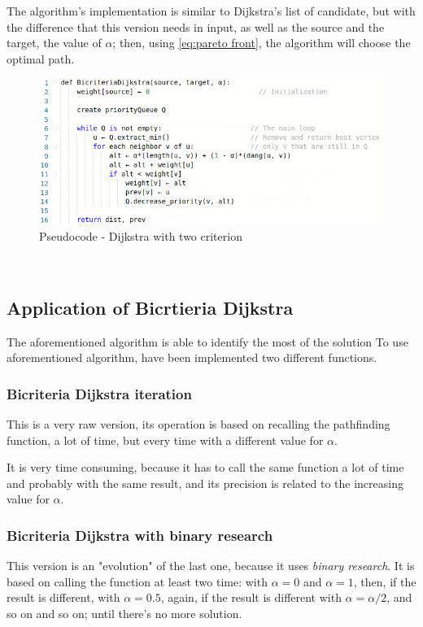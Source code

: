 \documentclass[a4paper,12pt]{report}
\begin{document}
\vspace{5mm}

The algorithm's implementation is similar to Dijkstra's list of candidate, but with the difference that this version needs in input, as well as the source and the target, the value of $\alpha$; then, using \eqref{eq:pareto front}, the algorithm will choose the optimal path.

\begin{figure}[h]
	\centering
	\includegraphics[width=\linewidth]{img/bicriteriaDijkstra.png}
	\caption{Pseudocode - Dijkstra with two criterion}
	\label{fig:bicriteriaDijkstra}
\end{figure}
\
\subsection{Application of Bicrtieria Dijkstra}
The aforementioned algorithm is able to identify the most of the solution 
To use aforementioned algorithm, have been implemented two different functions.

\subsubsection{Bicriteria Dijkstra iteration}
This is a very raw version, its operation is based on recalling the pathfinding function, a lot of time, but every time with a different value for $\alpha$.

It is very time consuming, because it has to call the same function a lot of time and probably with the same result, and its precision is related to the increasing value for $\alpha$.

\subsubsection{Bicriteria Dijkstra with binary research}
This version is an "evolution" of the last one, because it uses \textit{binary research}. It is based on calling the function at least two time: with $\alpha = 0$ and $\alpha=1$, then, if the result is different, with $\alpha=0.5$, again, if the result is different with $\alpha=\alpha/2$, and so on and so on; until there's no more solution.
\end{document}
